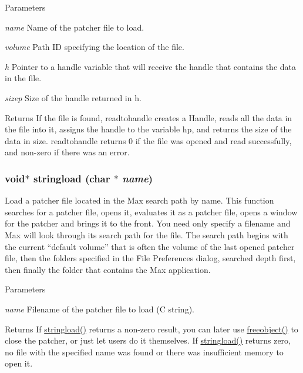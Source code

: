\begin{DoxyParams}{Parameters}
\item[{\em name}]Name of the patcher file to load. \item[{\em volume}]Path ID specifying the location of the file. \item[{\em h}]Pointer to a handle variable that will receive the handle that contains the data in the file. \item[{\em sizep}]Size of the handle returned in h. \end{DoxyParams}
\begin{DoxyReturn}{Returns}
If the file is found, readtohandle creates a Handle, reads all the data in the file into it, assigns the handle to the variable hp, and returns the size of the data in size. readtohandle returns 0 if the file was opened and read successfully, and non-\/zero if there was an error. 
\end{DoxyReturn}
\hypertarget{group__loading__max__files_ga8797a7efcb5a716e8ee0aa8a588b4a69}{
\subsubsection[{stringload}]{\setlength{\rightskip}{0pt plus 5cm}void$\ast$ stringload (char $\ast$ {\em name})}}
\label{group__loading__max__files_ga8797a7efcb5a716e8ee0aa8a588b4a69}


Load a patcher file located in the Max search path by name. This function searches for a patcher file, opens it, evaluates it as a patcher file, opens a window for the patcher and brings it to the front. You need only specify a filename and Max will look through its search path for the file. The search path begins with the current “default volume” that is often the volume of the last opened patcher file, then the folders specified in the File Preferences dialog, searched depth first, then finally the folder that contains the Max application.


\begin{DoxyParams}{Parameters}
\item[{\em name}]Filename of the patcher file to load (C string). \end{DoxyParams}
\begin{DoxyReturn}{Returns}
If \hyperlink{group__loading__max__files_ga8797a7efcb5a716e8ee0aa8a588b4a69}{stringload()} returns a non-\/zero result, you can later use \hyperlink{group__class__old_gadf30646e52376a37b93cc20efac65636}{freeobject()} to close the patcher, or just let users do it themselves. If \hyperlink{group__loading__max__files_ga8797a7efcb5a716e8ee0aa8a588b4a69}{stringload()} returns zero, no file with the specified name was found or there was insufficient memory to open it. 
\end{DoxyReturn}
